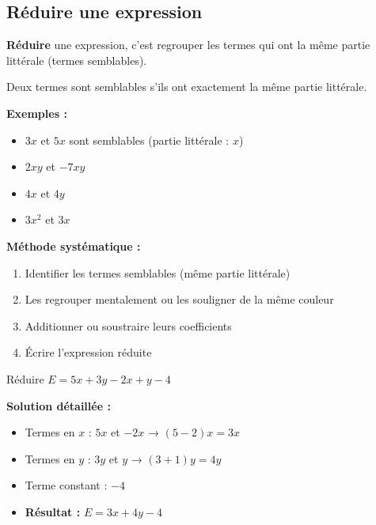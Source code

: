 \subsection{Réduire une expression}

\begin{definitionbox}[Réduction]
	\textbf{Réduire} une expression, c'est regrouper les termes qui ont la même partie littérale (termes semblables).
\end{definitionbox}

\begin{proprietebox}
	Deux termes sont semblables s'ils ont exactement la même partie littérale.
	
	\textbf{Exemples :}
	\begin{itemize}
		\item $3x$ et $5x$ sont semblables (partie littérale : $x$)
		\item $2xy$ et $-7xy$ 
		\item $4x$ et $4y$ 
		\item $3x^2$ et $3x$ 
	\end{itemize}
\end{proprietebox}

\begin{methodebox}
	\textbf{Méthode systématique :}
	\begin{enumerate}
		\item Identifier les termes semblables (même partie littérale)
		\item Les regrouper mentalement ou les souligner de la même couleur
		\item Additionner ou soustraire leurs coefficients
		\item Écrire l'expression réduite
	\end{enumerate}
\end{methodebox}

\begin{examplebox}
	Réduire $E = 5x + 3y - 2x + y - 4$
	
	\textbf{Solution détaillée :}
	\begin{itemize}
		\item Termes en $x$ : $5x$ et $-2x$ → $(5 - 2)x = 3x$
		\item Termes en $y$ : $3y$ et $y$ → $(3 + 1)y = 4y$
		\item Terme constant : $-4$
		\item \textbf{Résultat :} $E = 3x + 4y - 4$
	\end{itemize}
\end{examplebox}

